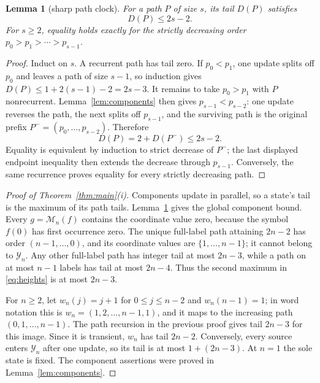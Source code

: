 \documentclass[a4paper,10pt]{amsart}
\newtheorem{lemma}[theorem]{Lemma}
\theoremstyle{remark}
\newcommand{\M}{\mathcal M}
\newcommand{\Y}{\mathcal Y}
\begin{document}
\begin{lemma}[sharp path clock]\label{lem:path-clock}
For a path $P$ of size $s$, its tail $D(P)$ satisfies
\begin{equation}\label{eq:path-bound}
 D(P)\leq2s-2.
\end{equation}
For $s\geq2$, equality holds exactly for the strictly decreasing order
$p_0>p_1>\cdots>p_{s-1}$.
\end{lemma}

\begin{proof}
Induct on $s$.  A recurrent path has tail zero.  If $p_0<p_1$, one update
splits off $p_0$ and leaves a path of size $s-1$, so induction gives
$D(P)\leq1+2(s-1)-2=2s-3$.  It remains to take $p_0>p_1$ with $P$
nonrecurrent.  Lemma~\ref{lem:components} then gives
$p_{s-1}<p_{s-2}$: one update reverses the path, the next splits off
$p_{s-1}$, and the surviving path is the original prefix
$P^-=(p_0,\ldots,p_{s-2})$.  Therefore
\[
 D(P)=2+D(P^-)\leq2s-2.
\]
Equality is equivalent by induction to strict decrease of $P^-$; the last
displayed endpoint inequality then extends the decrease through
$p_{s-1}$.  Conversely, the same recurrence proves equality for every
strictly decreasing path.
\end{proof}

\begin{proof}[Proof of Theorem~\ref{thm:main}(i)]
Components update in parallel, so a state's tail is the maximum of its path
tails.  Lemma~\ref{lem:path-clock} gives the global component bound.
Every $g=\M_n(f)$ contains the coordinate value zero, because the symbol
$f(0)$ has first occurrence zero.  The unique full-label path attaining
$2n-2$ has order $(n-1,\ldots,0)$, and its coordinate values are
$\{1,\ldots,n-1\}$; it cannot belong to $\Y_n$.  Any other full-label path
has integer tail at most $2n-3$, while a path on at most $n-1$ labels has
tail at most $2n-4$.  Thus the second maximum in \eqref{eq:heights} is at
most $2n-3$.

For $n\geq2$, let $w_n(j)=j+1$ for $0\leq j\leq n-2$ and
$w_n(n-1)=1$; in word notation this is
$w_n=(1,2,\ldots,n-1,1)$, and it maps to the increasing path
$(0,1,\ldots,n-1)$.  The path recursion in the
previous proof gives tail $2n-3$ for this image.  Since it is transient,
$w_n$ has tail $2n-2$.  Conversely, every source enters $\Y_n$ after one
update, so its tail is at most $1+(2n-3)$.  At $n=1$ the sole state is
fixed.  The component assertions were proved in Lemma~\ref{lem:components}.
\end{proof}
\end{document}

